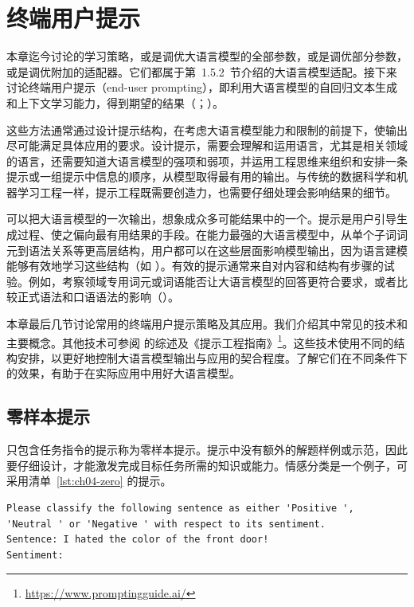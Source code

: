 \section{终端用户提示}
\label{sec:ch04-end-user}
本章迄今讨论的学习策略，或是调优大语言模型的全部参数，或是调优部分参数，或是调优附加的适配器。它们都属于第~1.5.2~节介绍的大语言模型适配。接下来讨论终端用户提示（end-user prompting），即利用大语言模型的自回归文本生成和上下文学习能力，得到期望的结果（；）。

这些方法通常通过设计提示结构，在考虑大语言模型能力和限制的前提下，使输出尽可能满足具体应用的要求。设计提示，需要会理解和运用语言，尤其是相关领域的语言，还需要知道大语言模型的强项和弱项，并运用工程思维来组织和安排一条提示或一组提示中信息的顺序，从模型取得最有用的输出。与传统的数据科学和机器学习工程一样，提示工程既需要创造力，也需要仔细处理会影响结果的细节。

\begin{practicaltip}
可以把大语言模型的一次输出，想象成众多可能结果中的一个。提示是用户引导生成过程、使之偏向最有用结果的手段。在能力最强的大语言模型中，从单个子词词元到语法关系等更高层结构，用户都可以在这些层面影响模型输出，因为语言建模能够有效地学习这些结构（如 ）。有效的提示通常来自对内容和结构有步骤的试验。例如，考察领域专用词元或词语能否让大语言模型的回答更符合要求，或者比较正式语法和口语语法的影响（）。
\end{practicaltip}

本章最后几节讨论常用的终端用户提示策略及其应用。我们介绍其中常见的技术和主要概念。其他技术可参阅 的综述及《提示工程指南》\footnote{\url{https://www.promptingguide.ai/}}。这些技术使用不同的结构安排，以更好地控制大语言模型输出与应用的契合程度。了解它们在不同条件下的效果，有助于在实际应用中用好大语言模型。

\subsection{零样本提示}
\label{sec:ch04-zero}
只包含任务指令的提示称为零样本提示。提示中没有额外的解题样例或示范，因此要仔细设计，才能激发完成目标任务所需的知识或能力。情感分类是一个例子，可采用清单~\ref{lst:ch04-zero} 的提示。

\noindent\begin{minipage}{\linewidth}
\begin{lstlisting}[caption={零样本情感分类提示},label={lst:ch04-zero}]
Please classify the following sentence as either 'Positive ',
'Neutral ' or 'Negative ' with respect to its sentiment.
Sentence: I hated the color of the front door!
Sentiment:
\end{lstlisting}
\end{minipage}\par

